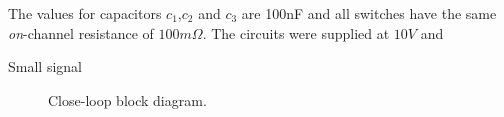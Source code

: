 The values for capacitors $c_1$,$c_2$ and $c_3$ are 100nF and all switches have the same \emph{on}-channel resistance of $100m\Omega$. The circuits were supplied at $10V$ and 

 Small signal

\begin{figure}[!h]
    \centering
    
    \caption[]{Close-loop block diagram.}
    \label{fig:close_loop_diagram}
\end{figure}
